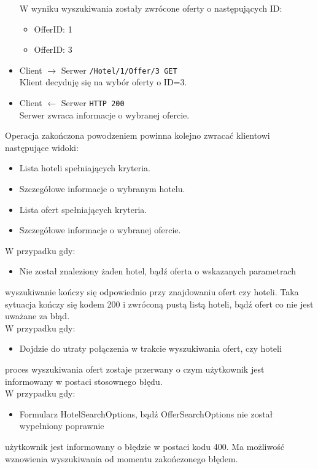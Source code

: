 \documentclass{article}
\begin{document}
\begin{itemize}
    W wyniku wyszukiwania zostały zwrócone oferty o następujących ID:
    \begin{itemize}
        \item OfferID: 1
        \item OfferID: 3
    \end{itemize}
    \item Client $\rightarrow$ Serwer \texttt{/Hotel/{1}/Offer/{3} GET}\\ 
    Klient decyduję się na wybór oferty o ID=3.
    \item Client $\leftarrow$ Serwer \texttt{HTTP 200}\\ 
    Serwer zwraca informacje o wybranej ofercie.
\end{itemize}
Operacja zakończona powodzeniem powinna kolejno zwracać klientowi następujące widoki:
\begin{itemize}
    \item Lista hoteli spełniających kryteria.
    \item Szczegółowe informacje o wybranym hotelu.
    \item Lista ofert spełniających kryteria.
    \item Szczegółowe informacje o wybranej ofercie.
\end{itemize}
W przypadku gdy:
\begin{itemize}
    \item Nie został znaleziony żaden hotel, bądź oferta o wskazanych parametrach
\end{itemize}
wyszukiwanie kończy się odpowiednio przy znajdowaniu ofert czy hoteli. Taka sytuacja kończy się kodem 200 i zwróconą pustą listą hoteli, bądź ofert co nie jest uważane za błąd.\\
W przypadku gdy:
\begin{itemize}
    \item Dojdzie do utraty połączenia w trakcie wyszukiwania ofert, czy hoteli
\end{itemize}
proces wyszukiwania ofert zostaje przerwany o czym użytkownik jest informowany w postaci stosownego błędu.\\
W przypadku gdy:
\begin{itemize}
    \item Formularz HotelSearchOptions, bądź OfferSearchOptions nie został wypełniony poprawnie
\end{itemize}
użytkownik jest informowany o błędzie w postaci kodu 400. Ma możliwość wznowienia wyszukiwania od momentu zakończonego błędem.
\end{document}
